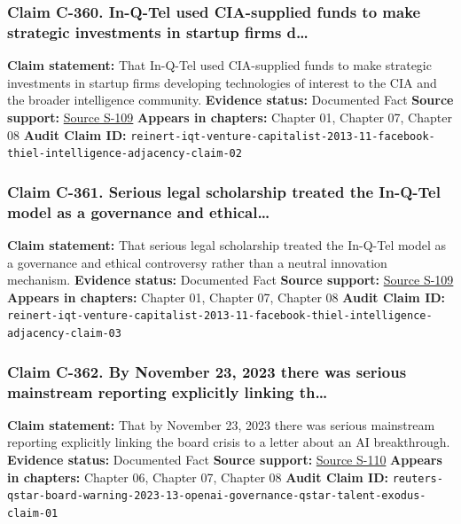 \documentclass[
  american,
  11pt,
  letterpaper,
]{article}
\begin{document}
\subsubsection{Claim C-360. In-Q-Tel used CIA-supplied funds to make
strategic investments in startup firms
d\ldots{}}\label{claim-c-360-in-q-tel-used-cia-supplied-funds-to-make-strategic-investments-in-startup-firms-d}

\textbf{Claim statement:} That In-Q-Tel used CIA-supplied funds to make
strategic investments in startup firms developing technologies of
interest to the CIA and the broader intelligence community.
\textbf{Evidence status:} Documented Fact \textbf{Source support:}
\hyperref[source-s-109-in-q-tel-the-central-intelligence-agency-as-venture-capitalist]{Source
S-109} \textbf{Appears in chapters:} Chapter 01, Chapter 07, Chapter 08
\textbf{Audit Claim ID:}
\texttt{reinert-iqt-venture-capitalist-2013-11-facebook-thiel-intelligence-adjacency-claim-02}

\subsubsection{Claim C-361. Serious legal scholarship treated the
In-Q-Tel model as a governance and
ethical\ldots{}}\label{claim-c-361-serious-legal-scholarship-treated-the-in-q-tel-model-as-a-governance-and-ethical}

\textbf{Claim statement:} That serious legal scholarship treated the
In-Q-Tel model as a governance and ethical controversy rather than a
neutral innovation mechanism. \textbf{Evidence status:} Documented Fact
\textbf{Source support:}
\hyperref[source-s-109-in-q-tel-the-central-intelligence-agency-as-venture-capitalist]{Source
S-109} \textbf{Appears in chapters:} Chapter 01, Chapter 07, Chapter 08
\textbf{Audit Claim ID:}
\texttt{reinert-iqt-venture-capitalist-2013-11-facebook-thiel-intelligence-adjacency-claim-03}

\subsubsection{Claim C-362. By November 23, 2023 there was serious
mainstream reporting explicitly linking
th\ldots{}}\label{claim-c-362-by-november-23-2023-there-was-serious-mainstream-reporting-explicitly-linking-th}

\textbf{Claim statement:} That by November 23, 2023 there was serious
mainstream reporting explicitly linking the board crisis to a letter
about an AI breakthrough. \textbf{Evidence status:} Documented Fact
\textbf{Source support:}
\hyperref[source-s-110-openai-researchers-warned-board-of-ai-breakthrough-ahead-of-ceo-ouster-sources-say]{Source
S-110} \textbf{Appears in chapters:} Chapter 06, Chapter 07, Chapter 08
\textbf{Audit Claim ID:}
\texttt{reuters-qstar-board-warning-2023-13-openai-governance-qstar-talent-exodus-claim-01}
\end{document}
